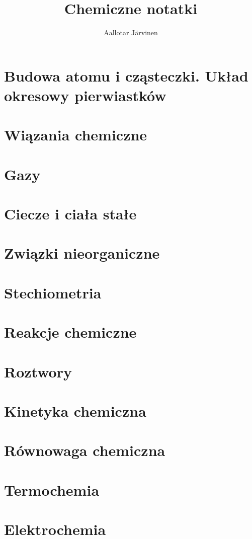 \documentclass{createspace}
\author{Aallotar Järvinen}
\title{Chemiczne notatki}
\begin{document}
\tableofcontents

\chapter{Budowa atomu i cząsteczki. Układ okresowy pierwiastków}

\chapter{Wiązania chemiczne}

\chapter{Gazy}

\chapter{Ciecze i ciała stałe}

\chapter{Związki nieorganiczne}

\chapter{Stechiometria}

\chapter{Reakcje chemiczne}

\chapter{Roztwory}

\chapter{Kinetyka chemiczna}

\chapter{Równowaga chemiczna}

\chapter{Termochemia}

\chapter{Elektrochemia}
\end{document}

